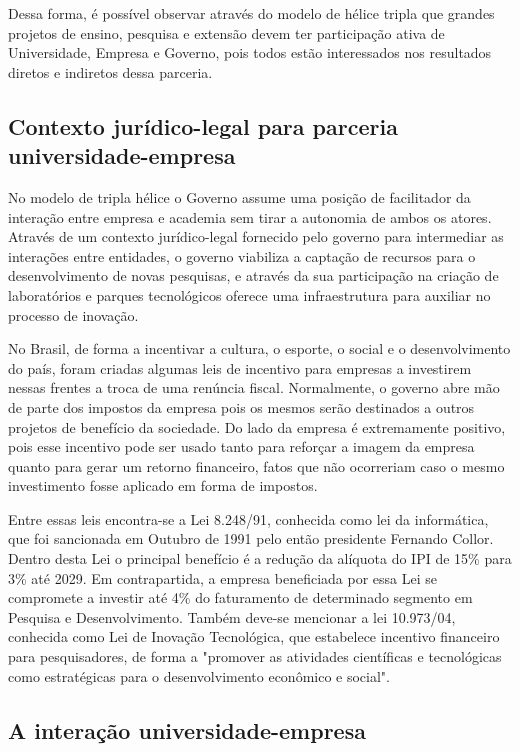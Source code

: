 Dessa forma, é possível observar através do modelo de hélice tripla que grandes projetos de ensino, pesquisa e extensão devem ter participação ativa de Universidade, Empresa e Governo, pois todos estão interessados nos resultados diretos e indiretos dessa parceria.

\subsection{Contexto jurídico-legal para parceria universidade-empresa}
\label{cha:juridico_legal}

No modelo de tripla hélice o Governo assume uma posição de facilitador da interação entre empresa e academia sem tirar a autonomia de ambos os atores. Através de um contexto jurídico-legal fornecido pelo governo para intermediar as interações entre entidades, o governo viabiliza a captação de recursos para o desenvolvimento de novas pesquisas, e através da sua participação na criação de laboratórios e parques tecnológicos oferece uma infraestrutura para  auxiliar no processo de inovação.

No Brasil, de forma a incentivar a cultura, o esporte, o social e o desenvolvimento do país, foram criadas algumas leis de incentivo para empresas a investirem nessas frentes a troca de uma renúncia fiscal.  Normalmente, o governo abre mão de parte dos impostos da empresa pois os mesmos serão destinados a outros projetos de benefício da sociedade. Do lado da empresa é extremamente positivo, pois esse incentivo pode ser usado tanto para reforçar a imagem da empresa quanto para gerar um retorno financeiro, fatos que não ocorreriam caso o mesmo investimento fosse aplicado em forma de impostos.

Entre essas leis encontra-se a Lei 8.248/91, conhecida como lei da informática, que foi sancionada em Outubro de 1991 pelo então presidente Fernando Collor. Dentro desta Lei o principal benefício é a redução da alíquota do IPI de 15\% para 3\% até 2029. Em contrapartida, a empresa beneficiada por essa Lei se compromete a investir até 4\% do faturamento de determinado segmento em Pesquisa e Desenvolvimento. Também deve-se mencionar a lei 10.973/04, conhecida como Lei de Inovação Tecnológica, que estabelece incentivo financeiro para pesquisadores, de forma a "promover as atividades científicas e tecnológicas como estratégicas para o desenvolvimento econômico e social".

\subsection{A interação universidade-empresa}
\label{cha:univ_empresa}

